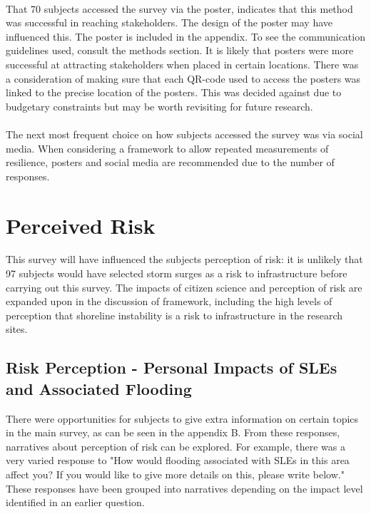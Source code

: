 \paragraph{}
That 70 subjects accessed the survey via the poster, indicates that this method was successful in reaching stakeholders. The design of the poster may have influenced this. The poster is included in the appendix. To see the communication guidelines used, consult the methods section. It is likely that posters were more successful at attracting stakeholders when placed in certain locations. There was a consideration of making sure that each QR-code used to access the posters was linked to the precise location of the posters. This was decided against due to budgetary constraints but may be worth revisiting for future research.

\paragraph{}
The next most frequent choice on how subjects accessed the survey was via social media. When considering a framework to allow repeated measurements of resilience, posters and social media are recommended due to the number of responses. 
\paragraph{}

\section{Perceived Risk}
This survey will have influenced the subjects perception of risk: it is unlikely that 97 subjects would have selected storm surges as a risk to infrastructure before carrying out this survey. The impacts of citizen science and perception of risk are expanded upon in the discussion of framework, including the high levels of perception that shoreline instability is a risk to infrastructure in the research sites.

\subsection{Risk Perception - Personal Impacts of SLEs and Associated Flooding}
There were opportunities for subjects to give extra information on certain topics in the main survey, as can be seen in the appendix B. From these responses, narratives about perception of risk can be explored. For example, there was a very varied response to "How would flooding associated with SLEs in this area affect you? If you would like to give more details on this, please write below." These responses have been grouped into narratives depending on the impact level identified in an earlier question. 

